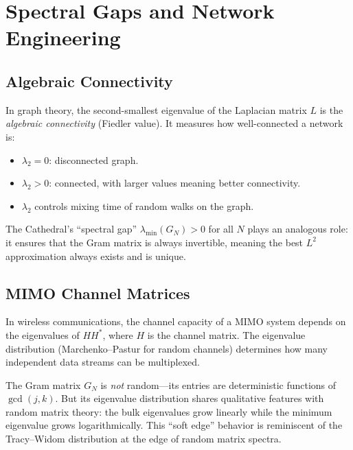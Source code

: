 \documentclass[11pt,a4paper]{article}
\begin{document}
\section{Spectral Gaps and Network Engineering}
\label{sec:networks}

\subsection{Algebraic Connectivity}

In graph theory, the second-smallest eigenvalue of the Laplacian
matrix $L$ is the \emph{algebraic connectivity} (Fiedler value).
It measures how well-connected a network is:

\begin{itemize}
  \item $\lambda_2 = 0$: disconnected graph.
  \item $\lambda_2 > 0$: connected, with larger values meaning
    better connectivity.
  \item $\lambda_2$ controls mixing time of random walks on the graph.
\end{itemize}

The Cathedral's ``spectral gap'' $\lambda_{\min}(G_N) > 0$ for all
$N$ plays an analogous role: it ensures that the Gram matrix is
always invertible, meaning the best $L^2$ approximation always
exists and is unique.

\subsection{MIMO Channel Matrices}

In wireless communications, the channel capacity of a MIMO system
depends on the eigenvalues of $H H^*$, where $H$ is the channel
matrix. The eigenvalue distribution (Marchenko--Pastur for random
channels) determines how many independent data streams can be
multiplexed.

The Gram matrix $G_N$ is \emph{not} random---its entries are
deterministic functions of $\gcd(j,k)$. But its eigenvalue
distribution shares qualitative features with random matrix theory:
the bulk eigenvalues grow linearly while the minimum eigenvalue
grows logarithmically. This ``soft edge'' behavior is reminiscent
of the Tracy--Widom distribution at the edge of random matrix spectra.

\end{document}
